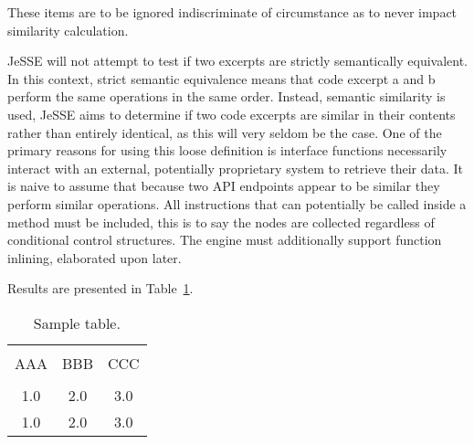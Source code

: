\documentclass[jou,apacite]{apa6}
\begin{document}
These items are to be ignored indiscriminate of circumstance as to never impact similarity calculation. 

JeSSE will not attempt to test if two excerpts are strictly semantically equivalent. In this context,  strict semantic equivalence means that code excerpt a and b perform the same operations in the same order. Instead, semantic similarity is used, JeSSE aims to determine if two code excerpts are similar in their contents rather than entirely identical, as this will very seldom be the case. One of the primary reasons for using this loose definition is interface functions necessarily interact with an external, potentially proprietary system to retrieve their data. It is naive to assume that because two API endpoints appear to be similar they perform similar operations. 
All instructions that can potentially be called inside a method must be included, this is to say the nodes are collected regardless of conditional control structures. The engine must additionally support function inlining, elaborated upon later.

Results are presented in Table~\ref{tab1}.
\begin{table}[!htb]
\caption{Sample table.}\label{tab1}
\begin{tabular}{ccc}
\hline\\[-1.5ex]
AAA & BBB & CCC \\[0.5ex]
\hline\\[-1.5ex]
1.0 & 2.0 & 3.0\\[0.5ex]
1.0 & 2.0 & 3.0\\[0.5ex]
\hline
\end{tabular}
\end{table}



\end{document}
